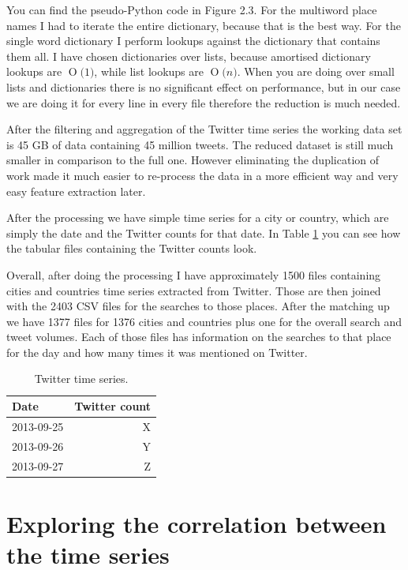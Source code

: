 \documentclass[minf,twoside,singlespacing,parskip,frontabs,notimes,11pt]{infthesis}
\newcommand{\BigO}[1]{\ensuremath{\operatorname{O}\bigl(#1\bigr)}}
\begin{document}
You can find the pseudo-Python code in Figure 2.3. For the multiword place names I had to iterate the entire dictionary, because that is the best way. For the single word dictionary I perform lookups against the dictionary that contains them all. I have chosen dictionaries over lists, because amortised dictionary lookups are  \BigO{1}, while list lookups are  \BigO{n}. When you are doing over small lists and dictionaries there is no significant effect on performance, but in our case we are doing it for every line in every file therefore the reduction is much needed.


After the filtering and aggregation of the Twitter time series the working data set is 45 GB of data containing 45 million tweets. The reduced dataset is still much smaller in comparison to the full one. However eliminating the duplication of work made it much easier to re-process the data in a more efficient way and very easy feature extraction later. 


After the processing we have simple time series for a city or country, which are simply the date and the Twitter counts for that date. In Table \ref{twit-ts} you can see how the tabular files containing the Twitter counts look. 

Overall, after doing the processing I have approximately 1500 files containing cities and countries time series extracted from Twitter. Those are then joined with the 2403 CSV files for the searches to those places. After the matching up we have 1377 files for 1376 cities and countries plus one for the overall search and tweet volumes. Each of those files has information on the searches to that place for the day and how many times it was mentioned on Twitter. 

\begin{table}[]
\begin{center}
\begin{tabular}{ l | r }
\textbf{Date} & \textbf{Twitter count}\\
\hline
2013-09-25 &  X \\
2013-09-26 &  Y \\
2013-09-27 &  Z \\
\end{tabular}
\end{center}
\caption{Twitter time series.}
\label{twit-ts}
\end{table}

\section{Exploring the correlation between the time series}
\end{document}
